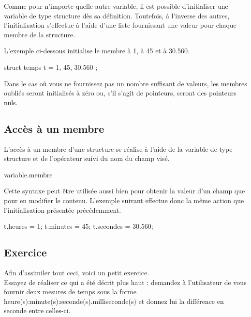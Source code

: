 Comme pour n'importe quelle autre variable, il est possible
d'initialiser une variable de type structure dès sa définition.
Toutefois, à l'inverse des autres, l'initialisation s'effectue à l'aide
d'une liste fournissant une valeur pour chaque membre de la structure.

L'exemple ci-dessous initialise le membre  à 1,
 à 45 et  à 30.560.

\begin{C}
struct temps t = { 1, 45, 30.560 };
\end{C}

\begin{attentionbox}
Dans le cas où vous ne fournissez pas
un nombre suffisant de valeurs, les membres oubliés seront initialisés à
zéro ou, s'il s'agit de pointeurs, seront des pointeurs nuls. 
\end{attentionbox}


\subsection{Accès à un membre}
\label{acces-a-un-membre}

L'accès à un membre d'une structure se réalise à l'aide de la variable
de type structure et de l'opérateur  suivi du nom du champ
visé.

\begin{C}
variable.membre
\end{C}

Cette syntaxe peut être utilisée aussi bien pour obtenir la valeur d'un
champ que pour en modifier le contenu. L'exemple suivant effectue donc
la même action que l'initialisation présentée précédemment.

\begin{C}
t.heures = 1;
t.minutes = 45;
t.secondes = 30.560;
\end{C}

\subsection{Exercice}
\label{exercice-5}

Afin d'assimiler tout ceci, voici un petit exercice.\\
Essayez de réaliser ce qui a été décrit plus haut : demandez à
l'utilisateur de vous fournir deux mesures de temps sous la forme
heure(s):minute(s):seconde(s).milliseconde(s) et donnez lui la
différence en seconde entre celles-ci.

